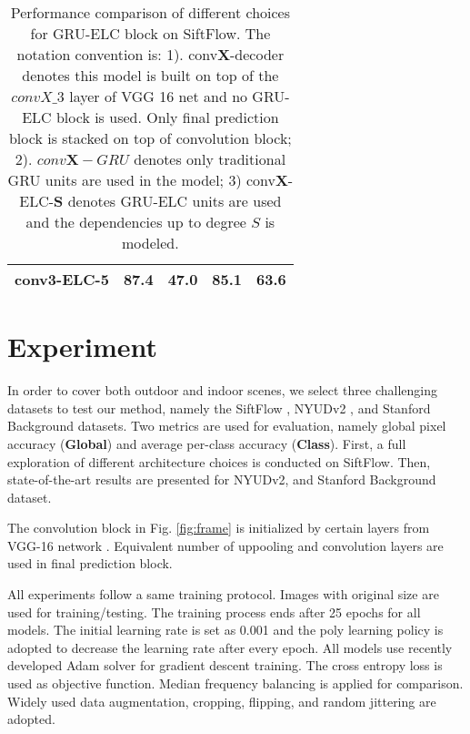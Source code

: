 \documentclass[10pt,twocolumn,letterpaper]{article}
\begin{document}
\begin{table*}
\begin{center}
\begin{tabular}{c|c|c|c|c}
\rowcolor{Gray}
conv3-ELC-5 & 87.4 & \textbf{47.0} & \textbf{85.1}  & 63.6 \\  %
\hline

\end{tabular}
\end{center}
\caption{Performance comparison of different choices for GRU-ELC block on SiftFlow. The notation convention is: 1). conv\textbf{X}-decoder denotes this model is built on top of the $convX\_3$ layer of VGG 16 net and no GRU-ELC block is used. Only final prediction block is stacked on top of convolution block; 2). $conv\textbf{X}-GRU$ denotes only traditional GRU units are used in the model; 3) conv\textbf{X}-ELC-\textbf{S} denotes GRU-ELC units are used and the dependencies up to degree $S$ is modeled.}
\label{all_siftflow}
\end{table*}



\section{Experiment}
In order to cover both outdoor and indoor scenes, we select three challenging datasets to test our method, namely the SiftFlow \cite{47}, NYUDv2 \cite{46}, and Stanford Background \cite{48} datasets. Two metrics are used for evaluation, namely global pixel accuracy (\textbf{Global}) and average per-class accuracy (\textbf{Class}). First, a full exploration of different architecture choices is conducted on SiftFlow. Then, state-of-the-art results are presented for NYUDv2, and Stanford Background dataset. 

The convolution block in Fig. \ref{fig:frame} is initialized by certain layers from VGG-16 network \cite{vgg}. Equivalent number of uppooling and convolution layers are used in final prediction block.

All experiments follow a same training protocol. Images with original size are used for training/testing. The training process ends after 25 epochs for all models. The initial learning rate is set as 0.001 and the poly learning policy is adopted to decrease the learning rate after every epoch. All models use recently developed Adam solver \cite{adam} for gradient descent training. The cross entropy loss is used as objective function. Median frequency balancing \cite{2} is applied for comparison. Widely used data augmentation, cropping, flipping, and random jittering are adopted. %
\end{document}
